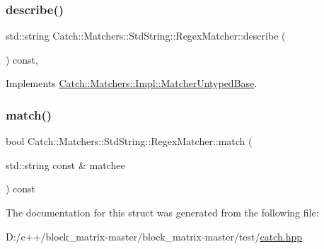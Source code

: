 \subsubsection{\texorpdfstring{describe()}{describe()}}
{\footnotesize\ttfamily std\+::string Catch\+::\+Matchers\+::\+Std\+String\+::\+Regex\+Matcher\+::describe (\begin{DoxyParamCaption}{ }\end{DoxyParamCaption}) const\hspace{0.3cm}{\ttfamily [override]}, {\ttfamily [virtual]}}



Implements \mbox{\hyperlink{class_catch_1_1_matchers_1_1_impl_1_1_matcher_untyped_base_a91d3a907dbfcbb596077df24f6e11fe2}{Catch\+::\+Matchers\+::\+Impl\+::\+Matcher\+Untyped\+Base}}.

\mbox{\label{struct_catch_1_1_matchers_1_1_std_string_1_1_regex_matcher_aa8e61adccabb2f36133029301f6b8f4e}} 
\subsubsection{\texorpdfstring{match()}{match()}}
{\footnotesize\ttfamily bool Catch\+::\+Matchers\+::\+Std\+String\+::\+Regex\+Matcher\+::match (\begin{DoxyParamCaption}\item[{std\+::string const \&}]{matchee }\end{DoxyParamCaption}) const\hspace{0.3cm}{\ttfamily [override]}}



The documentation for this struct was generated from the following file\+:\begin{DoxyCompactItemize}
\item 
D\+:/c++/block\+\_\+matrix-\/master/block\+\_\+matrix-\/master/test/\mbox{\hyperlink{catch_8hpp}{catch.\+hpp}}\end{DoxyCompactItemize}
